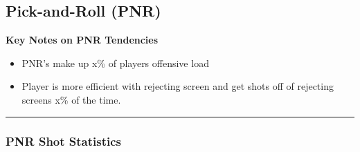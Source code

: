 \documentclass[a4paper,12pt]{article}
\begin{document}
\vspace{0em} %
\vspace{-1em} %

\clearpage





\subsection{Pick-and-Roll (PNR)}
\vspace{1.25em} %
\textbf{Key Notes on PNR Tendencies}
\vspace{0.5em} %

\begin{itemize}
    \item PNR's make up x\% of players offensive load
    \vspace{0.3em} %
    \item Player is more efficient with rejecting screen and get shots off of rejecting screens x\% of the time.
\end{itemize}

\vspace{1em} %
\hrule height 1pt width 1\textwidth %
\vspace{0em} %

\subsubsection{PNR Shot Statistics}
\end{document}
